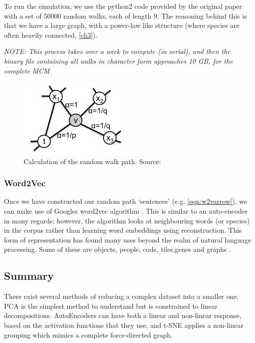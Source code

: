 To run the simulation, we use the python2 code provided by the original paper \citep{node2vec} with a set of 50000 random walks, each of length 9. The reasoning behind this is that we have a large graph, with a power-law like structure (where species are often heavily connected, \autoref{ch3}).

\textit{NOTE: This process takes over a week to compute (in serial), and then the binary file containing all walks in character form approaches 10 GB, for the complete MCM. }

\begin{figure}[H]
  \centering
\includegraphics[width=0.5\textwidth]{4fig/n2vedge.png}
\caption{Calculation of the random walk path. Source:\citep{node2vec}}\label{fig:n2vedge}
\end{figure}



\subsubsection{Word2Vec}\label{sec:w2v}
Once we have constructed our random path `sentences' (e.g. \autoref{eqn:w2varrow}), we can make use of Googles word2vec algorithm \citep{w2v}. This is similar to an auto-encoder in many regards; however, the algorithm looks at neighbouring words (or species) in the corpus rather than learning word embeddings using reconstruction. This form of representation has found many uses beyond the realm of natural language processing. Some of these are objects, people, code, tiles,genes and graphs \citep{objects,people,code,tile,gene,graph2vec}.


%
%

\subsection{Summary}
There exist several methods of reducing a complex dataset into a smaller one. PCA is the simplest method to understand but is constrained to linear decompositions. AutoEncoders can have both a linear and non-linear response, based on the activation functions that they use, and t-SNE applies a non-linear grouping which mimics a complete force-directed graph.

